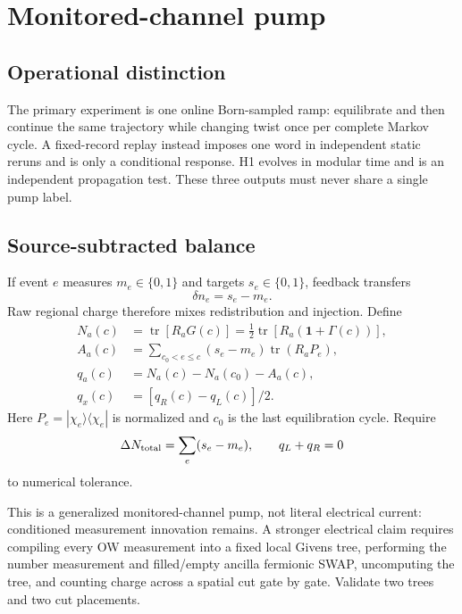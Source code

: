 \documentclass[aps,prb,onecolumn,nofootinbib,superscriptaddress]{revtex4-2}
\newcommand{\tr}{\operatorname{tr}}
\newcommand{\Geng}{\Gamma}
\begin{document}
\section{Monitored-channel pump}
\label{sec:circuit}

\subsection{Operational distinction}

The primary experiment is one online Born-sampled ramp: equilibrate and then
continue the same trajectory while changing twist once per complete Markov
cycle.  A fixed-record replay instead imposes one word in independent static
reruns and is only a conditional response.  H1 evolves in modular time and is
an independent propagation test.  These three outputs must never share a
single pump label.

\subsection{Source-subtracted balance}

If event $e$ measures $m_e\in\{0,1\}$ and targets $s_e\in\{0,1\}$, feedback
transfers
\begin{equation}
 \delta n_e=s_e-m_e.
\end{equation}
Raw regional charge therefore mixes redistribution and injection.  Define
\begin{align}
 N_a(c)&=\tr[R_aG(c)]=\tfrac12\tr[R_a(\mathbf{1}+\Geng(c))],\\
 A_a(c)&=\sum_{c_0<e\le c}(s_e-m_e)\tr(R_aP_e),\\
 q_a(c)&=N_a(c)-N_a(c_0)-A_a(c),\\
 q_x(c)&=[q_R(c)-q_L(c)]/2.
 \label{eq:circuitpump}
\end{align}
Here $P_e=|\chi_e\rangle\langle\chi_e|$ is normalized and $c_0$ is the last
equilibration cycle.  Require
\begin{equation}
 \Delta N_{\rm total}=\sum_e(s_e-m_e),\qquad q_L+q_R=0
 \label{eq:continuity}
\end{equation}
to numerical tolerance.

This is a generalized monitored-channel pump, not literal electrical current:
conditioned measurement innovation remains.  A stronger electrical claim
requires compiling every OW measurement into a fixed local Givens tree,
performing the number measurement and filled/empty ancilla fermionic SWAP,
uncomputing the tree, and counting charge across a spatial cut gate by gate.
Validate two trees and two cut placements.
\end{document}
